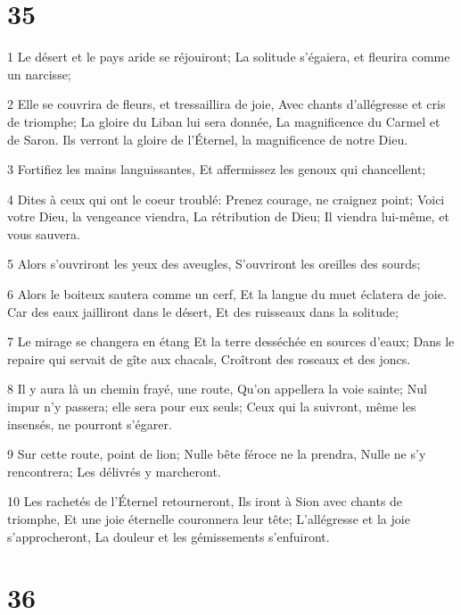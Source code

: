 \chapter{35}

\par 1 Le désert et le pays aride se réjouiront; La solitude s'égaiera, et fleurira comme un narcisse;
\par 2 Elle se couvrira de fleurs, et tressaillira de joie, Avec chants d'allégresse et cris de triomphe; La gloire du Liban lui sera donnée, La magnificence du Carmel et de Saron. Ils verront la gloire de l'Éternel, la magnificence de notre Dieu.
\par 3 Fortifiez les mains languissantes, Et affermissez les genoux qui chancellent;
\par 4 Dites à ceux qui ont le coeur troublé: Prenez courage, ne craignez point; Voici votre Dieu, la vengeance viendra, La rétribution de Dieu; Il viendra lui-même, et vous sauvera.
\par 5 Alors s'ouvriront les yeux des aveugles, S'ouvriront les oreilles des sourds;
\par 6 Alors le boiteux sautera comme un cerf, Et la langue du muet éclatera de joie. Car des eaux jailliront dans le désert, Et des ruisseaux dans la solitude;
\par 7 Le mirage se changera en étang Et la terre desséchée en sources d'eaux; Dans le repaire qui servait de gîte aux chacals, Croîtront des roseaux et des joncs.
\par 8 Il y aura là un chemin frayé, une route, Qu'on appellera la voie sainte; Nul impur n'y passera; elle sera pour eux seuls; Ceux qui la suivront, même les insensés, ne pourront s'égarer.
\par 9 Sur cette route, point de lion; Nulle bête féroce ne la prendra, Nulle ne s'y rencontrera; Les délivrés y marcheront.
\par 10 Les rachetés de l'Éternel retourneront, Ils iront à Sion avec chants de triomphe, Et une joie éternelle couronnera leur tête; L'allégresse et la joie s'approcheront, La douleur et les gémissements s'enfuiront.

\chapter{36}

